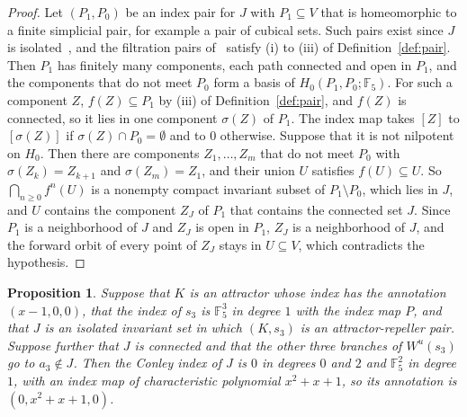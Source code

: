 \documentclass[11pt]{article}
\theoremstyle{plain}
\newtheorem{proposition}{Proposition}[section]
\theoremstyle{definition}
\theoremstyle{remark}
\newcommand{\F}{\mathbb{F}_5}
\begin{document}
\begin{proof}
Let $(P_1,P_0)$ be an index pair for $J$ with $P_1\subseteq V$ that is homeomorphic to a finite simplicial pair, for example a pair of cubical sets. Such pairs exist since $J$ is isolated~\cite{FR00,Mro99}, and the filtration pairs of~\cite{FR00} satisfy (i) to (iii) of Definition~\ref{def:pair}. Then $P_1$ has finitely many components, each path connected and open in $P_1$, and the components that do not meet $P_0$ form a basis of $H_0(P_1,P_0;\F)$. For such a component $Z$, $f(Z)\subseteq P_1$ by (iii) of Definition~\ref{def:pair}, and $f(Z)$ is connected, so it lies in one component $\sigma(Z)$ of $P_1$. The index map takes $[Z]$ to $[\sigma(Z)]$ if $\sigma(Z)\cap P_0=\emptyset$ and to $0$ otherwise. Suppose that it is not nilpotent on $H_0$. Then there are components $Z_1,\dots,Z_m$ that do not meet $P_0$ with $\sigma(Z_k)=Z_{k+1}$ and $\sigma(Z_m)=Z_1$, and their union $U$ satisfies $f(U)\subseteq U$. So $\bigcap_{n\geq0}f^n(U)$ is a nonempty compact invariant subset of $P_1\setminus P_0$, which lies in $J$, and $U$ contains the component $Z_J$ of $P_1$ that contains the connected set $J$. Since $P_1$ is a neighborhood of $J$ and $Z_J$ is open in $P_1$, $Z_J$ is a neighborhood of $J$, and the forward orbit of every point of $Z_J$ stays in $U\subseteq V$, which contradicts the hypothesis.
\end{proof}

\begin{proposition}\label{prop:J}
Suppose that $K$ is an attractor whose index has the annotation $(x-1,0,0)$, that the index of $s_3$ is $\F^3$ in degree $1$ with the index map $P$, and that $J$ is an isolated invariant set in which $(K,s_3)$ is an attractor-repeller pair. Suppose further that $J$ is connected and that the other three branches of $W^u(s_3)$ go to $a_3\notin J$. Then the Conley index of $J$ is $0$ in degrees $0$ and $2$ and $\F^2$ in degree $1$, with an index map of characteristic polynomial $x^2+x+1$, so its annotation is $(0,x^2+x+1,0)$.
\end{proposition}
\end{document}
